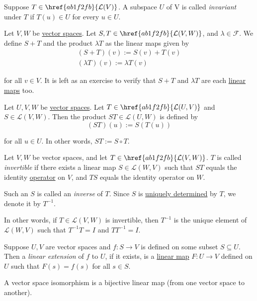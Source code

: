 Suppose $T\in\href{ab1f2fb}{\mathcal L(V)}$. A subspace $U$ of V is called
\textit{invariant} under $T$ if $T(u)\in U$ for every $u\in U$.

\label{e257b42}

Let $V,W$ be \href{fc83050}{vector spaces}. Let $S,T\in\href{ab1f2fb}{\mathcal
L(V,W)}$, and $\lambda\in\mathcal F$. We define $S+T$ and the product $\lambda
T$ as the linear maps given by
\begin{gather*}
  (S+T)(v):=S(v)+T(v)\\
  (\lambda T)(v):=\lambda T(v)
\end{gather*}

for all $v\in V$. It is left as an exercise to verify that $S+T$ and $\lambda
T$ are each \href{d7d1925}{linear maps} too.

\label{a6afdc2}

Let $U,V,W$ be \href{fc83050}{vector spaces}. Let $T\in\href{ab1f2fb}{\mathcal
L(U,V)}$ and $S\in\mathcal L(V,W)$. Then the product $ST\in\mathcal L(U,W)$ is
defined by
$$
  (ST)(u):=S(T(u))
$$

for all $u\in U$. In other words, $ST:=S\circ T$.

\label{e1ba7ee}

Let $V,W$ be vector spaces, and let $T\in\href{ab1f2fb}{\mathcal L(V,W)}$. $T$
is called \textit{invertible} if there exists a linear map $S\in\mathcal
L(W,V)$ such that $ST$ equals the identity \href{bd31d9c}{operator} on $V$, and
$TS$ equals the identity operator on $W$.

Such an $S$ is called an \textit{inverse} of $T$. Since $S$ is
\href{c2b81d6}{uniquely determined} by $T$, we denote it by $T^{-1}$.

In other words, if $T\in\mathcal L(V,W)$ is invertible, then $T^{-1}$ is the
unique element of $\mathcal L(W,V)$ such that $T^{-1}T=I$ and $TT^{-1}=I$.

\label{c4fd746}

Suppose $U,V$ are vector spaces and $f:S\to V$ is defined on some subset
$S\subseteq U$. Then a \textit{linear extension} of $f$ to $U$, if it exists,
is a \href{d7d1925}{linear map} $F:U\to V$ defined on $U$ such that $F(s)=f(s)$
for all $s\in S$.

\label{d0ad6cb}

A vector space isomorphism is a bijective linear map (from one vector space to
another).

